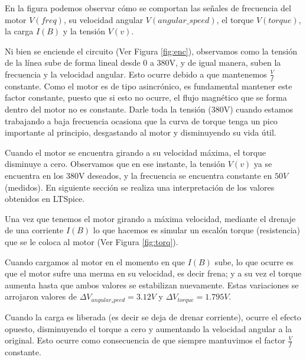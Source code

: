 \documentclass[e4_tp3_main.tex]{subfiles}
\begin{document}
En la figura podemos observar cómo se comportan las señales de frecuencia del motor $V(freq)$, su velocidad angular $V(angular\_speed)$, el torque $V(torque)$, la carga $I(B)$ y la tensión $V(v)$.
\vspace{0.5cm}

Ni bien se enciende el circuito (Ver Figura \ref{fig:enc}), observamos como la tensión de la línea sube de forma lineal desde 0 a 380V, y de igual manera, suben la frecuencia y la velocidad angular. Esto ocurre debido a que mantenemos $\frac{V}{f}$ constante. Como el motor es de tipo asincrónico, es fundamental mantener este factor constante, puesto que si esto no ocurre, el flujo magnético que se forma dentro del motor no es constante. Darle toda la tensi\'on (380V) cuando estamos trabajando a baja frecuencia ocasiona que la curva de torque tenga un pico importante al principio, desgastando al motor y disminuyendo su vida útil.
\vspace{0.5cm}

Cuando el motor se encuentra girando a su velocidad m\'axima, el torque disminuye a cero. Observamos que en ese instante, la tensión $V(v)$ ya se encuentra en los 380V deseados, y la frecuencia se encuentra constante en $50V$ (medidos). En siguiente secci\'on se realiza una interpretaci\'on de los valores obtenidos en LTSpice. 
\vspace{0.5cm}

Una vez que tenemos el motor girando a máxima velocidad, mediante el drenaje de una corriente $I(B)$ lo que hacemos es simular un escal\'on torque (resistencia) que se le coloca al motor (Ver Figura \ref{fig:torq}). 
\vspace{0.5cm}

Cuando cargamos al motor en el momento en que $I(B)$ sube, lo que ocurre es que el motor sufre una merma en su velocidad, es decir frena; y a su vez el torque aumenta hasta que ambos valores se estabilizan nuevamente. Estas variaciones se arrojaron valores de $\Delta V_{angular_speed}=3.12 V$ y $\Delta V_{torque}=1.795 V$.
\vspace{0.5cm}


Cuando la carga es liberada (es decir se deja de drenar corriente), ocurre el efecto opuesto, disminuyendo el torque a cero y aumentando la velocidad angular a la original. Esto ocurre como consecuencia de que siempre mantuvimos el factor $\frac{V}{f}$ constante.
\end{document}
